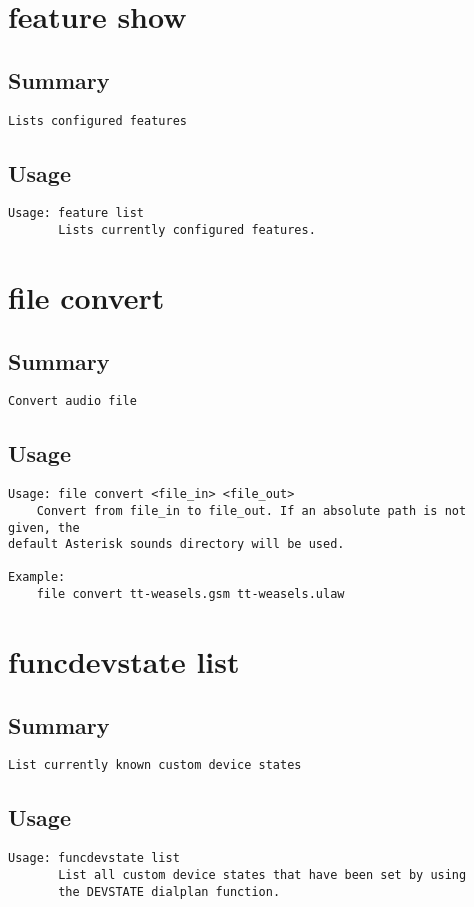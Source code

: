 \section{feature show}
\subsection{Summary}
\begin{verbatim}
Lists configured features
\end{verbatim}
\subsection{Usage}
\begin{verbatim}
Usage: feature list
       Lists currently configured features.

\end{verbatim}


\section{file convert}
\subsection{Summary}
\begin{verbatim}
Convert audio file
\end{verbatim}
\subsection{Usage}
\begin{verbatim}
Usage: file convert <file_in> <file_out>
    Convert from file_in to file_out. If an absolute path is not given, the
default Asterisk sounds directory will be used.

Example:
    file convert tt-weasels.gsm tt-weasels.ulaw

\end{verbatim}


\section{funcdevstate list}
\subsection{Summary}
\begin{verbatim}
List currently known custom device states
\end{verbatim}
\subsection{Usage}
\begin{verbatim}
Usage: funcdevstate list
       List all custom device states that have been set by using
       the DEVSTATE dialplan function.

\end{verbatim}


